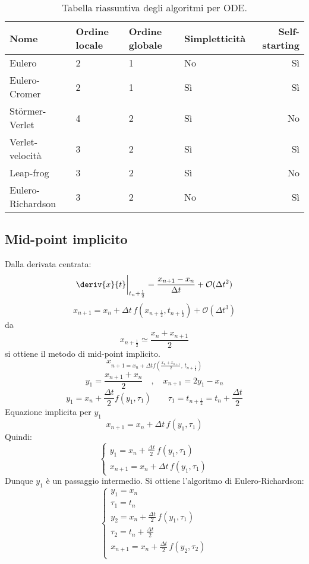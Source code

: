 \begin{table}
\begin{adjustbox}{center}
\begin{tabular}{llllr}
\toprule
Nome & Ordine locale & Ordine globale & Simpletticità & Self-starting \\
\midrule
Eulero & 2 & 1 & No & Sì \\
Eulero-Cromer & 2 & 1 & Sì & Sì \\
Störmer-Verlet & 4 & 2 & Sì & No \\
Verlet-velocità & 3 & 2 & Sì & Sì \\
Leap-frog & 3 & 2 & Sì & No \\
Eulero-Richardson & 3 & 2 & No & Sì \\
\bottomrule
\end{tabular}
\end{adjustbox}
\caption{Tabella riassuntiva degli algoritmi per ODE.}
\end{table}

\subsection{Mid-point implicito}
Dalla derivata centrata:
\[
\deriv{x}{t} \bigg|_{t_n + \frac{1}{2}} = \frac{x_{n+1} - x_n}{\Delta t} + \mathcal O(\Delta t^2)
\]
\[
x_{n+1} = x_n + \Delta t \, f(x_{n + \frac{1}{2}}, t_{n + \frac{1}{2}}) + \mathcal O(\Delta t^3)
\]
da
\[
x_{n + \frac{1}{2}} \simeq \frac{x_n + x_{n+1}}{2}
\]
si ottiene il metodo di mid-point implicito.
\[
x_{n+1 = x_n + \Delta t f\left(\frac{x_n + x_{n+1}}{2}, \, t_{n + \frac{1}{2}}\right)}
\]
\[
y_1 = \frac{x_{n+1} + x_n}{2} \quad , \quad x_{n+1} = 2 y_1 - x_n
\]
\[
y_1 = x_n + \frac{\Delta t}{2} f(y_1, \tau_1) \qquad \tau_1 = t_{n + \frac{1}{2}} = t_n + \frac{\Delta t}{2}
\]
Equazione implicita per $y_1$
\[
x_{n+1} = x_n + \Delta t \, f(y_1, \tau_1)
\]
Quindi:
\[
\begin{cases}
y_1 = x_n + \frac{\Delta t}{2} \, f(y_1, \tau_1) \\
x_{n+1} = x_n + \Delta t \, f(y_1, \tau_1)
\end{cases}
\]
Dunque $y_1$ è un passaggio intermedio. Si ottiene l'algoritmo di Eulero-Richardson:
\[
\begin{cases}
y_1 = x_n \\
\tau_1 = t_n \\
y_2 = x_n + \frac{\Delta t}{2} \, f(y_1, \tau_1) \\
\tau_2 = t_n + \frac{\Delta t}{2} \\
x_{n+1} = x_n + \frac{\Delta t}{2} \, f(y_2, \tau_2) \\
\end{cases}
\]



